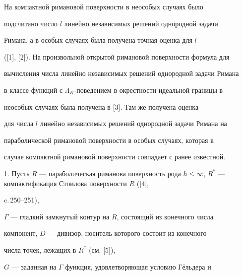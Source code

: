 \date{}




\pagestyle{plain} %







\maketitle


\label{begin}








На компактной римановой поверхности в неособых случаях было


подсчитано число $l$ линейно независимых решений однородной задачи


Римана, а в особых случаях была получена точная оценка для $l$


([1], [2]). На произвольной открытой римановой поверхности формула для


вычисления числа линейно независимых решений однородной задачи Римана


в классе функций с $\Lambda_K$-поведением в окрестности идеальной границы в


неособых случаях была получена в [3]. Там же получена оценка


для числа $l$ линейно независимых решений однородной задачи Римана на


параболической римановой поверхности в особых случаях, которая в


случае компактной римановой поверхности совпадает с ранее известной.





1. Пусть $R$ --- параболическая риманова поверхность рода $h\leqslant


\infty$, $R^*$ --- компактификация Стоилова поверхности $R$ ([4],


c.\,250--251),


$\Gamma$ --- гладкий замкнутый контур на $R$, состоящий из конечного числа


компонент, $D$ --- дивизор, носитель которого состоит из конечного


числа точек,   лежащих в $R^*$ (см. [5]),


$G$ --- заданная на $\Gamma$ функция, удовлетворяющая условию Г\"ельдера и


